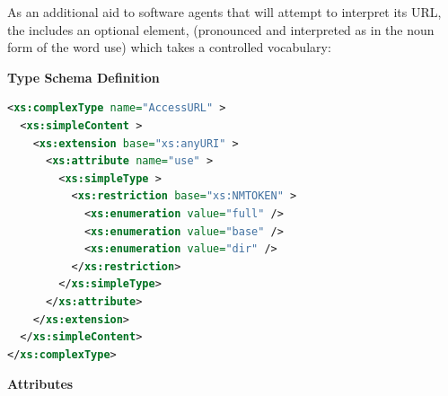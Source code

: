 \documentclass[11pt,a4paper]{ivoa}
\begin{document}
As an additional aid to software agents that will attempt to interpret
its URL, the  includes an optional element,
 (pronounced and interpreted as in the noun form of
the word use) which takes a controlled vocabulary:


\begingroup
      	\renewcommand*\descriptionlabel[1]{%
      	\hbox to 5.5em{\emph{#1}\hfil}}\vspace{1ex}\noindent\textbf{ Type Schema Definition}

\begin{lstlisting}[language=XML,basicstyle=\footnotesize]
<xs:complexType name="AccessURL" >
  <xs:simpleContent >
    <xs:extension base="xs:anyURI" >
      <xs:attribute name="use" >
        <xs:simpleType >
          <xs:restriction base="xs:NMTOKEN" >
            <xs:enumeration value="full" />
            <xs:enumeration value="base" />
            <xs:enumeration value="dir" />
          </xs:restriction>
        </xs:simpleType>
      </xs:attribute>
    </xs:extension>
  </xs:simpleContent>
</xs:complexType>
\end{lstlisting}

\vspace{0.5ex}\noindent\textbf{ Attributes}
\end{document}
